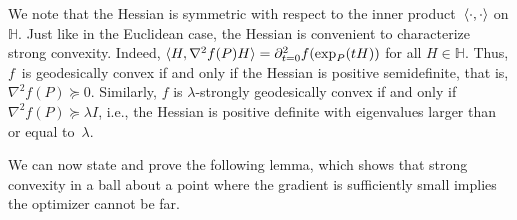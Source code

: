 \documentclass[aos]{imsart}
\theoremstyle{definition}
\numberwithin{equation}{section}
\renewcommand{\H}{{\mathbb{H}}}
\begin{document}
We note that the Hessian is symmetric with respect to the inner product~$\braket{\cdot,\cdot}$ on $\H$.
Just like in the Euclidean case, the Hessian is convenient to characterize strong convexity.
Indeed, $\braket{H, \nabla^2 f(P) H} = \partial^2_{t=0} f(\exp_{P}(tH))$ for all $H\in \H$.
Thus, $f$~is geodesically convex if and only if the Hessian is positive semidefinite, that is, $\nabla^2 f(P) \succeq 0$. %
Similarly, $f$ is $\lambda$-strongly geodesically convex if and only if~$\nabla^2 f(P) \succeq \lambda I$, i.e., the Hessian is positive definite with eigenvalues larger than or equal to~$\lambda$.

We can now state and prove the following lemma, which shows that strong convexity in a ball about a point where the gradient is sufficiently small implies the optimizer cannot be far.
\end{document}
